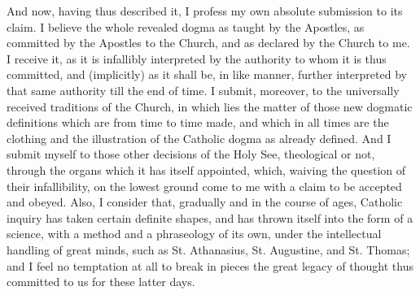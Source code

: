 And now, having thus described it, I profess my own absolute
submission to its claim. I believe the whole revealed dogma as taught by
the Apostles, as committed by the Apostles to the Church, and as
declared by the Church to me. I receive it, as it is infallibly
interpreted by the authority to whom it is thus committed, and
(implicitly) as it shall be, in like manner, further interpreted by that
same authority till the end of time. I submit, moreover, to the
universally received traditions of the Church, in which lies the matter
of those new dogmatic definitions which are from time to time
made, and which in all times are the clothing and the illustration of
the Catholic dogma as already defined. And I submit myself to those
other decisions of the Holy See, theological or not, through the organs
which it has itself appointed, which, waiving the question of their
infallibility, on the lowest ground come to me with a claim to be
accepted and obeyed. Also, I consider that, gradually and in the course
of ages, Catholic inquiry has taken certain definite shapes, and has
thrown itself into the form of a science, with a method and a
phraseology of its own, under the intellectual handling of great minds,
such as St. Athanasius, St. Augustine, and St. Thomas; and I feel no
temptation at all to break in pieces the great legacy of thought thus
committed to us for these latter days.

